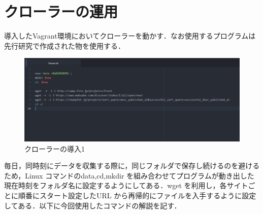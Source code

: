\newpage

\section{クローラーの運用}
導入したVagrant環境においてクローラーを動かす．なお使用するプログラムは先行研究で作成された物を使用する\cite{miura}．

\begin{figure}[h]
\centering
\includegraphics[width=12cm]{hozon1.PNG}
\caption{クローラーの導入1}\label{サンプル図}
\end{figure}
毎日，同時刻にデータを収集する際に，同じフォルダで保存し続けるのを避けるため，Linux コマンドのdata,cd,mkdir を組み合わせてプログラムが動き出した現在時刻をフォルダ名に設定するようにしてある．wget を利用し，各サイトごとに順番にスタート設定したURL から再帰的にファイルを入手するように設定してある．以下に今回使用したコマンドの解説を記す．

